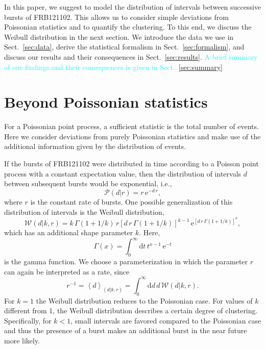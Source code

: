 \documentclass[fleqn,usenatbib]{mnras}
\newcommand{\new}[1]{\textcolor{cyan}{#1}}
\begin{document}
In this paper, we suggest to model the distribution of intervals between successive bursts of FRB121102. This allows us to consider simple deviations from Poissonian statistics and to quantify the clustering. To this end, we discuss the Weibull distribution in the next section. We introduce the data we use in Sect.~\ref{sec:data}, derive the statistical formalism in Sect.~\ref{sec:formalism}, and discuss our results and their consequences in Sect.~\ref{sec:results}. \new{A brief summary of our findings and their consequences is given in Sect.~\ref{sec:summary}.}


\section{Beyond Poissonian statistics}
\label{sec:weibull}

For a Poissonian point process, a sufficient statistic is the total number of events. Here we consider deviations from purely Poissonian statistics and make use of the additional information given by the distribution of events.

If the bursts of FRB121102 were distributed in time according to a Poisson point process with a constant expectation value, then the distribution of intervals $d$ between subsequent bursts would be exponential, i.e.,
\begin{equation}
	\mathcal{P}(d|r) = r\,\mathrm{e}^{-d\,r},
\end{equation}
where $r$ is the constant rate of bursts. One possible generalization of this distribution of intervals is the Weibull distribution,
\begin{equation}
	\label{eq:weibull}
	\mathcal{W}(d|k,r) = k \, \Gamma\left(1 + 1/k\right) \, r \left[d \, r \, \Gamma\left(1 + 1/k\right)\right]^{k - 1} \, \mathrm{e}^{\left[d \, r \, \Gamma\left(1 + 1/k\right)\right]^k},
\end{equation}
which has an additional shape parameter $k$. Here,
\begin{equation}
	\Gamma(x) = \int_0^\infty \mathrm{d}t \, t^{x - 1} \, \mathrm{e}^{-t}
\end{equation}
is the gamma function. We choose a parameterization in which the parameter $r$ can again be interpreted as a rate, since
\begin{equation}
	r^{-1} = \left<d\right>_{(d|k,r)} = \int_0^\infty \mathrm{d}d \, d \, \mathcal{W}(d|k,r).
\end{equation}
For $k=1$ the Weibull distribution reduces to the Poissonian case. For values of $k$ different from 1, the Weibull distribution describes a certain degree of clustering. Specifically, for $k < 1$, small intervals are favored compared to the Poissonian case and thus the presence of a burst makes an additional burst in the near future more likely.
\end{document}
